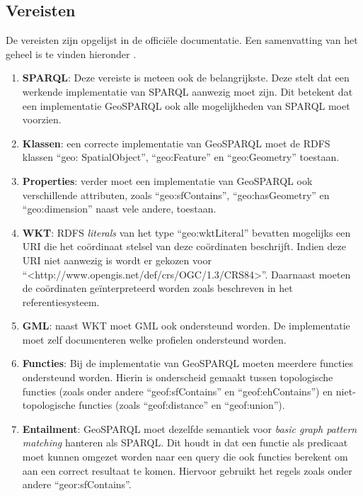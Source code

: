 \subsection{Vereisten}
De vereisten zijn opgelijst in de officiële documentatie. Een samenvatting van het geheel is te vinden hieronder \cite{ogcdocs}. 
\begin{enumerate}
    \item \textbf{SPARQL}: Deze vereiste is meteen ook de belangrijkste. Deze stelt dat een werkende implementatie van SPARQL aanwezig moet zijn. Dit betekent dat een implementatie GeoSPARQL ook alle mogelijkheden van SPARQL moet voorzien.
    \item \textbf{Klassen}: een correcte implementatie van GeoSPARQL moet de RDFS klassen ``geo: SpatialObject'', ``geo:Feature'' en ``geo:Geometry'' toestaan.
    \item \textbf{Properties}: verder moet een implementatie van GeoSPARQL ook verschillende attributen, zoals ``geo:sfContains'', ``geo:hasGeometry'' en ``geo:dimension'' naast vele andere, toestaan.
    \item \textbf{WKT}: RDFS \textit{literals} van het type ``geo:wktLiteral'' bevatten mogelijks een URI die het coördinaat stelsel van deze coördinaten beschrijft. Indien deze URI niet aanwezig is wordt er gekozen voor ``<http://www.opengis.net/def/crs/OGC/1.3/CRS84>''. Daarnaast moeten de coördinaten geïnterpreteerd worden zoals beschreven in het referentiesysteem.
    \item \textbf{GML}: naast WKT moet GML ook ondersteund worden. De implementatie moet zelf documenteren welke profielen ondersteund worden.
    \item \textbf{Functies}: Bij de implementatie van GeoSPARQL moeten meerdere functies ondersteund worden. Hierin is onderscheid gemaakt tussen topologische functies (zoals onder andere ``geof:sfContains'' en ``geof:ehContains'') en niet-topologische functies (zoals ``geof:distance'' en ``geof:union'').
    \item \textbf{Entailment}: GeoSPARQL moet dezelfde semantiek voor \textit{basic graph pattern matching} hanteren als SPARQL. Dit houdt in dat een functie als predicaat moet kunnen omgezet worden naar een query die ook functies berekent om aan een correct resultaat te komen. Hiervoor gebruikt het regels zoals onder andere ``geor:sfContains''.
\end{enumerate}


